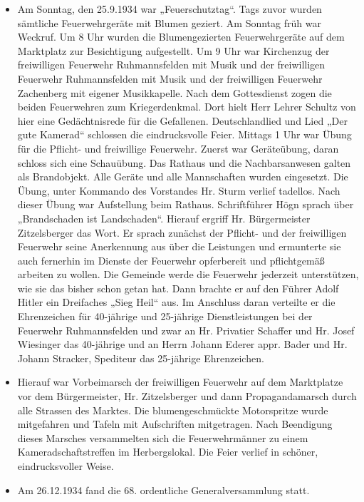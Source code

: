 \documentclass[12pt,a4paper]{book}
\begin{document}
\begin{itemize}
\item Am Sonntag, den 25.9.1934 war „Feuerschutztag“. Tags zuvor wurden
sämtliche Feuerwehrgeräte mit Blumen geziert. Am Sonntag früh war
Weckruf. Um 8 Uhr wurden die Blumengezierten Feuerwehrgeräte auf dem
Marktplatz zur Besichtigung aufgestellt. Um 9 Uhr war Kirchenzug der
freiwilligen Feuerwehr Ruhmannsfelden mit Musik und der freiwilligen
Feuerwehr Ruhmannsfelden mit Musik und der freiwilligen Feuerwehr
Zachenberg mit eigener Musikkapelle. Nach dem Gottesdienst zogen die
beiden Feuerwehren zum Kriegerdenkmal. Dort hielt Herr Lehrer Schultz
von hier eine Gedächtnisrede für die Gefallenen. Deutschlandlied und
Lied „Der gute Kamerad“ schlossen die eindrucksvolle Feier. Mittags 1
Uhr war Übung für die Pflicht- und freiwillige Feuerwehr. Zuerst war
Geräteübung, daran schloss sich eine Schauübung. Das Rathaus und die
Nachbarsanwesen galten als Brandobjekt. Alle Geräte und alle
Mannschaften wurden eingesetzt. Die Übung, unter Kommando des Vorstandes
Hr. Sturm verlief tadellos. Nach dieser Übung war Aufstellung beim
Rathaus. Schriftführer Högn sprach über „Brandschaden ist Landschaden“.
Hierauf ergriff Hr. Bürgermeister Zitzelsberger das Wort. Er sprach
zunächst der Pflicht- und der freiwilligen Feuerwehr seine Anerkennung
aus über die Leistungen und ermunterte sie auch fernerhin im Dienste der
Feuerwehr opferbereit und pflichtgemäß arbeiten zu wollen. Die Gemeinde
werde die Feuerwehr jederzeit unterstützen, wie sie das bisher schon
getan hat. Dann brachte er auf den Führer Adolf Hitler ein Dreifaches
„Sieg Heil“ aus. Im Anschluss daran verteilte er die Ehrenzeichen für
40-jährige und 25-jährige Dienstleistungen bei der Feuerwehr
Ruhmannsfelden und zwar an Hr. Privatier Schaffer und Hr. Josef
Wiesinger das 40-jährige und an Herrn Johann Ederer appr. Bader und Hr.
Johann Stracker, Spediteur das 25-jährige Ehrenzeichen.

\item Hierauf war Vorbeimarsch der freiwilligen Feuerwehr auf dem
Marktplatze vor dem Bürgermeister, Hr. Zitzelsberger und dann
Propagandamarsch durch alle Strassen des Marktes. Die blumengeschmückte
Motorspritze wurde mitgefahren und Tafeln mit Aufschriften mitgetragen.
Nach Beendigung dieses Marsches versammelten sich die Feuerwehrmänner zu
einem Kameradschaftstreffen im Herbergslokal. Die Feier verlief in
schöner, eindrucksvoller Weise.

\item Am 26.12.1934 fand die 68. ordentliche Generalversammlung statt.
\end{itemize}
\end{document}
